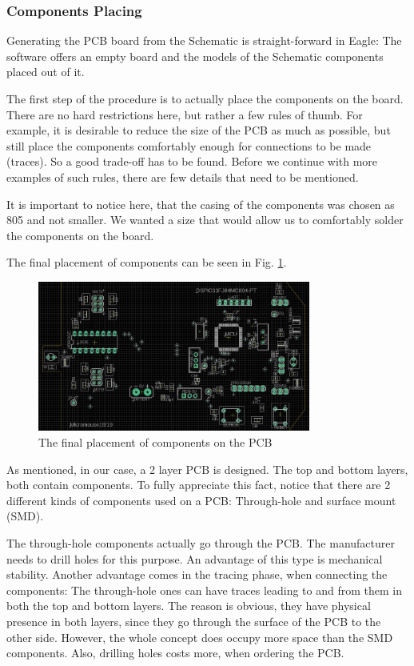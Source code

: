 \subsubsection{Components Placing}

Generating the PCB board from the Schematic is straight-forward in Eagle: The software offers an empty board and the models of the Schematic components placed out of it.

The first step of the procedure is to actually place the components on the board. There are no hard restrictions here, but rather a few rules of thumb. For example, it is desirable to reduce the size of the PCB as much as possible, but still place the components comfortably enough for connections to be made (traces). So a good trade-off has to be found. Before we continue with more examples of such rules, there are few details that need to be mentioned.

It is important to notice here, that the casing of the components was chosen as 805 and not smaller. We wanted a size that would allow us to comfortably solder the components on the board.

The final placement of components can be seen in Fig. \ref{fig:comp}.

\begin{figure}[htb]
    \centering
    \includegraphics[width=0.8\textwidth]{figures/hardware/PCB_Components.PNG}
    \caption{The final placement of components on the PCB}
    \label{fig:comp}
\end{figure}

As mentioned, in our case, a 2 layer PCB is designed. The top and bottom layers, both contain components. To fully appreciate this fact, notice that there are 2 different kinds of components used on a PCB: Through-hole and surface mount (SMD). 

The through-hole components actually go through the PCB. The manufacturer needs to drill holes for this purpose. An advantage of this type is mechanical stability. Another advantage comes in the tracing phase, when connecting the components: The through-hole ones can have traces leading to and from them in both the top and bottom layers. The reason is obvious, they have physical presence in both layers, since they go through the surface of the PCB to the other side. However, the whole concept does occupy more space than the SMD components. Also, drilling holes costs more, when ordering the PCB.

